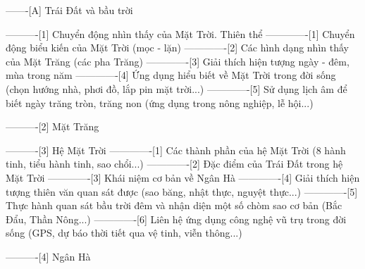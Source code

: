-------[A] Trái Đất và bầu trời

----------[1] Chuyển động nhìn thấy của Mặt Trời. Thiên thể
-------------[1] Chuyển động biểu kiến của Mặt Trời (mọc - lặn)
-------------[2] Các hình dạng nhìn thấy của Mặt Trăng (các pha Trăng)
-------------[3] Giải thích hiện tượng ngày - đêm, mùa trong năm
-------------[4] Ứng dụng hiểu biết về Mặt Trời trong đời sống (chọn hướng nhà, phơi đồ, lắp pin mặt trời...)
-------------[5] Sử dụng lịch âm để biết ngày trăng tròn, trăng non (ứng dụng trong nông nghiệp, lễ hội...)

----------[2] Mặt Trăng

----------[3] Hệ Mặt Trời
-------------[1] Các thành phần của hệ Mặt Trời (8 hành tinh, tiểu hành tinh, sao chổi...)
-------------[2] Đặc điểm của Trái Đất trong hệ Mặt Trời
-------------[3] Khái niệm cơ bản về Ngân Hà
-------------[4] Giải thích hiện tượng thiên văn quan sát được (sao băng, nhật thực, nguyệt thực...)
-------------[5] Thực hành quan sát bầu trời đêm và nhận diện một số chòm sao cơ bản (Bắc Đẩu, Thần Nông...)
-------------[6] Liên hệ ứng dụng công nghệ vũ trụ trong đời sống (GPS, dự báo thời tiết qua vệ tinh, viễn thông...)

----------[4] Ngân Hà
